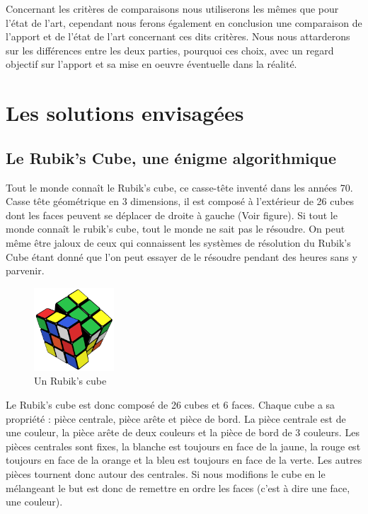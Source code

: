 Concernant les critères de comparaisons nous utiliserons les mêmes que pour l'état de l'art, cependant nous ferons également en conclusion une comparaison de l'apport et de l'état de l'art concernant ces dits critères. Nous nous attarderons sur les différences entre les deux parties, pourquoi ces choix, avec un regard objectif sur l'apport et sa mise en oeuvre éventuelle dans la réalité.

\newpage

\section{Les solutions envisagées}

\subsection{Le Rubik's Cube, une énigme algorithmique}

Tout le monde connaît le Rubik's cube, ce casse-tête inventé dans les années 70. Casse tête géométrique en 3 dimensions, il est composé à l'extérieur de 26 cubes dont les faces peuvent se déplacer de droite à gauche (Voir figure). Si tout le monde connaît le rubik's cube, tout le monde ne sait pas le résoudre. On peut même être jaloux de ceux qui connaissent les systèmes de résolution du Rubik's Cube étant donné que l'on peut essayer de le résoudre pendant des heures sans y parvenir.

\begin{figure}[!htb]
  \centering
  \includegraphics[width=30mm,scale=0.5]{images/rubiks-cube.png}
  \caption{Un Rubik's cube}
  \label{fig:boat1}
\end{figure}

Le Rubik's cube est donc composé de 26 cubes et 6 faces. Chaque cube a sa propriété : pièce centrale, pièce arête et pièce de bord. La pièce centrale est de une couleur, la pièce arête de deux couleurs et la pièce de bord de 3 couleurs. Les pièces centrales sont fixes, la blanche est toujours en face de la jaune, la rouge est toujours en face de la orange et la bleu est toujours en face de la verte. Les autres pièces tournent donc autour des centrales. Si nous modifions le cube en le mélangeant le but est donc de remettre en ordre les faces (c'est à dire une face, une couleur).

